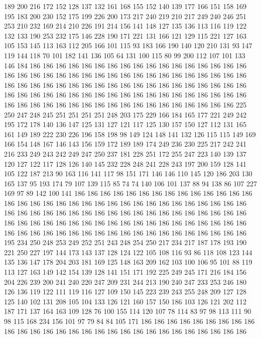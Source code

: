 189 200 216 172 152 128 137 132 161 168 155 152 140 139 177 166 151 158 169 195
183 200 230 152 175 199 226 200 173 217 240 219 210 217 249 240 246 251 253 210
232 169 214 210 226 191 214 156 141 148 127 135 136 113 116 119 122 132 133 190
253 232 175 146 228 190 171 221 131 166 121 129 115 221 127 163 105 153 145 113
163 112 205 166 101 115 93 183 166 190 140 120 210 131 93 147 119 144 118 70
101 182 141 136 105 64 131 100 115 80 99 200 112 107 101 133 146 184 186 186
186 186 186 186 186 186 186 186 186 186 186 186 186 186 186 186 186 186 186 186
186 186 186 186 186 186 186 186 186 186 186 186 186 186 186 186 186 186 186 186
186 186 186 186 186 186 186 186 186 186 186 186 186 186 186 186 186 186 186 186
186 186 186 186 186 186 186 186 186 186 186 186 186 186 186 186 186 186 186 186
186 186 186 186 186 186 186 186 186 186 225 250 247 248 245 251 251 251 251 248
203 175 229 166 184 165 177 221 249 242 195 172 178 140 136 147 125 131 127 121
117 125 130 157 150 127 112 131 165 161 149 189 222 230 226 196 158 198 98 149
124 148 141 132 126 115 115 149 169 166 154 148 167 146 143 156 159 172 189 189
174 249 236 230 225 217 242 241 216 233 249 243 242 249 247 250 237 181 228 251
172 255 247 223 140 139 137 120 127 122 117 128 126 140 145 232 228 248 241 228
243 197 200 159 128 141 105 122 187 213 90 163 116 141 117 98 151 171 146 146
110 145 120 186 203 130 165 137 95 193 174 79 107 139 115 85 74 74 140 106
101 137 88 94 138 86 107 227 169 97 89 142 100 141 186 186 186 186 186 186
186 186 186 186 186 186 186 186 186 186 186 186 186 186 186 186 186 186 186 186
186 186 186 186 186 186 186 186 186 186 186 186 186 186 186 186 186 186 186 186
186 186 186 186 186 186 186 186 186 186 186 186 186 186 186 186 186 186 186 186
186 186 186 186 186 186 186 186 186 186 186 186 186 186 186 186 186 186 186 186
186 186 186 186 195 234 250 248 253 249 252 251 243 248 254 250 217 234 217 187
178 193 190 221 250 227 197 144 173 143 137 128 124 122 105 108 116 93 86 118
108 123 144 135 136 147 178 204 203 181 169 125 148 163 209 162 103 100 106 95
101 88 119 113 127 163 149 142 154 139 128 141 151 171 192 225 249 245 171 216
184 156 204 226 239 200 241 240 220 247 209 231 244 213 190 240 247 233 253 246
180 126 136 119 122 111 119 116 127 109 150 145 223 239 243 255 248 209 127 128
125 140 102 131 208 105 104 133 126 121 160 157 150 186 103 126 121 202 112 187
171 137 164 163 109 128 76 100 155 114 120 107 78 114 83 97 98 113 111 90
98 115 168 234 156 101 97 79 84 84 105 171 186 186 186 186 186 186 186 186
186 186 186 186 186 186 186 186 186 186 186 186 186 186 186 186 186 186 186 186
